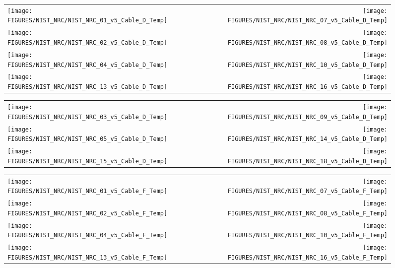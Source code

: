 \begin{figure}[p]
\begin{tabular*}{\textwidth}{l@{\extracolsep{\fill}}r}
\texttt{[image: FIGURES/NIST\_NRC/NIST\_NRC\_01\_v5\_Cable\_D\_Temp]} &
\texttt{[image: FIGURES/NIST\_NRC/NIST\_NRC\_07\_v5\_Cable\_D\_Temp]} \\
\texttt{[image: FIGURES/NIST\_NRC/NIST\_NRC\_02\_v5\_Cable\_D\_Temp]} &
\texttt{[image: FIGURES/NIST\_NRC/NIST\_NRC\_08\_v5\_Cable\_D\_Temp]} \\
\texttt{[image: FIGURES/NIST\_NRC/NIST\_NRC\_04\_v5\_Cable\_D\_Temp]} &
\texttt{[image: FIGURES/NIST\_NRC/NIST\_NRC\_10\_v5\_Cable\_D\_Temp]} \\
\texttt{[image: FIGURES/NIST\_NRC/NIST\_NRC\_13\_v5\_Cable\_D\_Temp]} &
\texttt{[image: FIGURES/NIST\_NRC/NIST\_NRC\_16\_v5\_Cable\_D\_Temp]}
\end{tabular*}
\label{NIST_NRC_Cable_D_Closed}
\end{figure}

\begin{figure}[p]
\begin{tabular*}{\textwidth}{l@{\extracolsep{\fill}}r}
\texttt{[image: FIGURES/NIST\_NRC/NIST\_NRC\_03\_v5\_Cable\_D\_Temp]} &
\texttt{[image: FIGURES/NIST\_NRC/NIST\_NRC\_09\_v5\_Cable\_D\_Temp]} \\
\texttt{[image: FIGURES/NIST\_NRC/NIST\_NRC\_05\_v5\_Cable\_D\_Temp]} &
\texttt{[image: FIGURES/NIST\_NRC/NIST\_NRC\_14\_v5\_Cable\_D\_Temp]} \\
\texttt{[image: FIGURES/NIST\_NRC/NIST\_NRC\_15\_v5\_Cable\_D\_Temp]} &
\texttt{[image: FIGURES/NIST\_NRC/NIST\_NRC\_18\_v5\_Cable\_D\_Temp]}
\end{tabular*}
\label{NIST_NRC_Cable_D_Open}
\end{figure}

\begin{figure}[p]
\begin{tabular*}{\textwidth}{l@{\extracolsep{\fill}}r}
\texttt{[image: FIGURES/NIST\_NRC/NIST\_NRC\_01\_v5\_Cable\_F\_Temp]} &
\texttt{[image: FIGURES/NIST\_NRC/NIST\_NRC\_07\_v5\_Cable\_F\_Temp]} \\
\texttt{[image: FIGURES/NIST\_NRC/NIST\_NRC\_02\_v5\_Cable\_F\_Temp]} &
\texttt{[image: FIGURES/NIST\_NRC/NIST\_NRC\_08\_v5\_Cable\_F\_Temp]} \\
\texttt{[image: FIGURES/NIST\_NRC/NIST\_NRC\_04\_v5\_Cable\_F\_Temp]} &
\texttt{[image: FIGURES/NIST\_NRC/NIST\_NRC\_10\_v5\_Cable\_F\_Temp]} \\
\texttt{[image: FIGURES/NIST\_NRC/NIST\_NRC\_13\_v5\_Cable\_F\_Temp]} &
\texttt{[image: FIGURES/NIST\_NRC/NIST\_NRC\_16\_v5\_Cable\_F\_Temp]}
\end{tabular*}
\label{NIST_NRC_Cable_F_Closed}
\end{figure}

